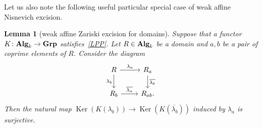 \documentclass[oneside, 11pt]{amsart} \pdfoutput=1
\newcommand{\Ker}{\mathop{\mathrm{Ker}}\nolimits}
\numberwithin{equation}{section}
\newtheorem{lemma}{Lemma} \numberwithin{lemma}{section}
\theoremstyle{definition}
\newcommand{\catname}[1]{{\normalfont\textbf{#1}}} %
\begin{document}
Let us also note the following useful particular special case of weak affine Nisnevich excision.
\begin{lemma}[weak affine Zariski excision for domains]
	\label{zgl} Suppose that a functor $K\colon \catname{Alg}_k \to \catname{Grp}$ satisfies~\ref{LPP}. Let $R \in \catname{Alg}_k$ be a domain and $a, b$ be a pair of coprime elements of $R$. Consider the diagram
$$\begin{tikzcd}
	R \ar{r}{\lambda_a} \ar{d}[swap]{\lambda_b} & R_a \ar{d}{\overline{\lambda_b}}\\
	R_b \ar{r}{\overline{\lambda_a}} & R_{ab}.
\end{tikzcd}$$
	Then the natural map $\Ker(K(\lambda_b)) \to \Ker(K(\overline{\lambda_b}))$ induced by $\lambda_a$ is surjective.
\end{lemma}
%
\end{document}
